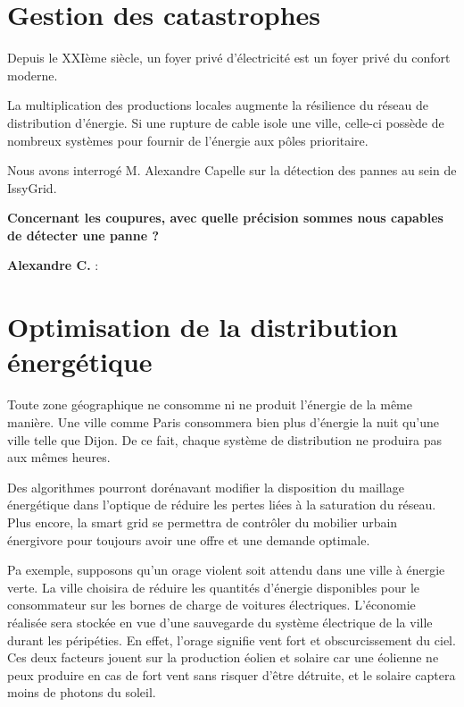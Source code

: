 
\section{Gestion des catastrophes}

Depuis le XXIème siècle, un foyer privé d'électricité est un foyer privé du confort moderne.

La multiplication des productions locales augmente la résilience du réseau de distribution d'énergie.
Si une rupture de cable isole une ville, celle-ci possède de nombreux systèmes pour fournir
de l'énergie aux pôles prioritaire.

Nous avons interrogé M. Alexandre Capelle sur la détection des pannes au sein de IssyGrid.

\textbf{Concernant les coupures, avec quelle précision sommes nous capables de détecter une panne ?}

\textbf{Alexandre C.} :


\section{Optimisation de la distribution énergétique}

Toute zone géographique ne consomme ni ne produit l'énergie de la même manière.
Une ville comme Paris consommera bien plus d'énergie la nuit qu'une ville telle que Dijon.
De ce fait, chaque système de distribution ne produira pas aux mêmes heures.

Des algorithmes pourront dorénavant modifier la disposition du maillage énergétique dans l'optique
de réduire les pertes liées à la saturation du réseau. Plus encore, la smart grid se permettra de contrôler
du mobilier urbain énergivore pour toujours avoir une offre et une demande optimale.

Pa exemple, supposons qu'un orage violent soit attendu dans une ville à énergie verte.
La ville choisira de réduire les quantités d'énergie disponibles pour le consommateur sur les bornes
de charge de voitures électriques.
L'économie réalisée sera stockée en vue d'une sauvegarde du système électrique de la ville durant les péripéties.
En effet, l'orage signifie vent fort et obscurcissement du ciel. Ces deux facteurs jouent sur la production
éolien et solaire car une éolienne ne peux produire en cas de fort vent sans risquer d'être détruite, et le solaire
captera moins de photons du soleil.

